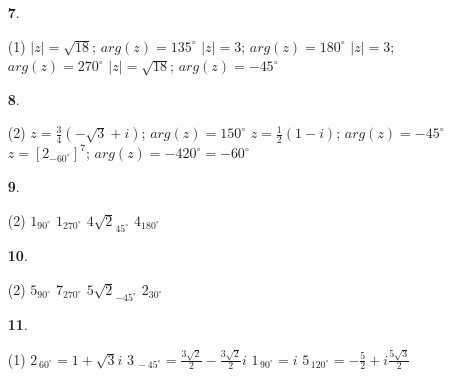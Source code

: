 \documentclass[a4paper, pdf, twoside]{book}
\begin{document}
\begin{multicols}{2}
\begin{enumerate}

 \item[\fontfamily{phv}\selectfont\color{blue}\textbf{7}. ] 
 \begin{tasks}[column-sep=1em, item-indent=1.3333em](1)
	 \task* $|z|=\sqrt {18}$; $arg(z)=135^\circ $
	 \task $|z|=3$; $arg(z)=180^\circ $
	 \task $|z|=3$; $arg(z)=270^\circ $
	 \task* $|z|=\sqrt {18}$; $arg(z)=-45^\circ $
\end{tasks}
 \end{enumerate}
\begin{enumerate}
\vspace{0.25cm}



 \item[\fontfamily{phv}\selectfont\color{blue}\textbf{8}. ] 
 \begin{tasks}[column-sep=1em, item-indent=1.3333em](2)
	 \task* $z=\frac {3}{4}(-\sqrt {3}+i)$; $arg(z)=150^\circ $
	 \task* $z=\frac {1}{2}(1-i)$; $arg(z)=-45^\circ $
	 \task* $z=\left [2_{-60^\circ }\right ]^7$; $arg(z)=-420^\circ =-60^\circ $
\end{tasks}
\vspace{0.25cm}



 \item[\fontfamily{phv}\selectfont\color{blue}\textbf{9}. ] 
 \begin{tasks}[column-sep=1em, item-indent=1.3333em](2)
	 \task $1_{90^\circ }$
	 \task $1_{270^\circ }$
	 \task $4\sqrt {2}_{45^\circ }$
	 \task $4_{180^\circ }$
\end{tasks}
\vspace{0.25cm}



 \item[\fontfamily{phv}\selectfont\color{blue}\textbf{10}. ] 
 \begin{tasks}[column-sep=1em, item-indent=1.3333em](2)
	 \task $5_{90^\circ }$
	 \task $7_{270^\circ }$
	 \task $5\sqrt {2}_{-45^\circ }$
	 \task $2_{30^\circ }$
\end{tasks}
\vspace{0.25cm}



 \item[\fontfamily{phv}\selectfont\color{blue}\textbf{11}. ]  \scalebox{0.6}{\simbolclau } 
 \begin{tasks}[column-sep=1em, item-indent=1.3333em](1)
	 \task*  $2_{\,60^\circ }= 1 + \sqrt {3} i$
	 \task* $3_{\,-45^\circ }= \frac {3\sqrt {2}}{2} - \frac {3\sqrt {2}}{2} i$
	 \task $1_{\,90^\circ }= i $
	 \task* $5_{\,120^\circ }= -\frac {5}{2} + i \frac {5\sqrt {3}}{2}$
\end{tasks}
 \end{enumerate}
\vspace{0.3cm}


\end{multicols}
\end{document}
